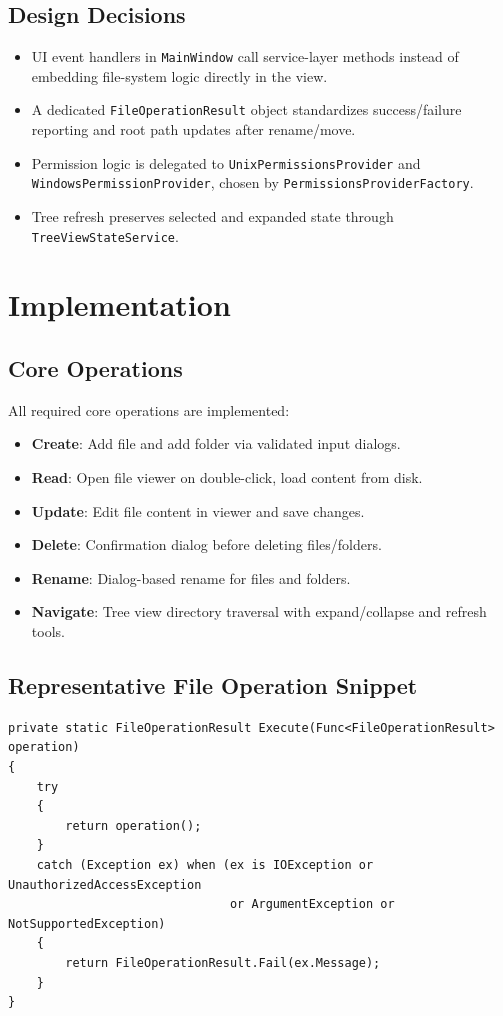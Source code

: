 \documentclass[11pt]{article}
\begin{document}
\subsection*{Design Decisions}
\begin{itemize}
  \item UI event handlers in \texttt{MainWindow} call service-layer methods instead of embedding file-system logic directly in the view.
  \item A dedicated \texttt{FileOperationResult} object standardizes success/failure reporting and root path updates after rename/move.
  \item Permission logic is delegated to \texttt{UnixPermissionsProvider} and \texttt{WindowsPermissionProvider}, chosen by \texttt{PermissionsProviderFactory}.
  \item Tree refresh preserves selected and expanded state through \texttt{TreeViewStateService}.
\end{itemize}

\section{Implementation}
\subsection*{Core Operations}
All required core operations are implemented:
\begin{itemize}
  \item \textbf{Create}: Add file and add folder via validated input dialogs.
  \item \textbf{Read}: Open file viewer on double-click, load content from disk.
  \item \textbf{Update}: Edit file content in viewer and save changes.
  \item \textbf{Delete}: Confirmation dialog before deleting files/folders.
  \item \textbf{Rename}: Dialog-based rename for files and folders.
  \item \textbf{Navigate}: Tree view directory traversal with expand/collapse and refresh tools.
\end{itemize}

\subsection*{Representative File Operation Snippet}
\begin{lstlisting}[style=csharp,caption={Simplified pattern used by FileOperationsService for robust operations}]
private static FileOperationResult Execute(Func<FileOperationResult> operation)
{
    try
    {
        return operation();
    }
    catch (Exception ex) when (ex is IOException or UnauthorizedAccessException
                               or ArgumentException or NotSupportedException)
    {
        return FileOperationResult.Fail(ex.Message);
    }
}
\end{lstlisting}
\end{document}
